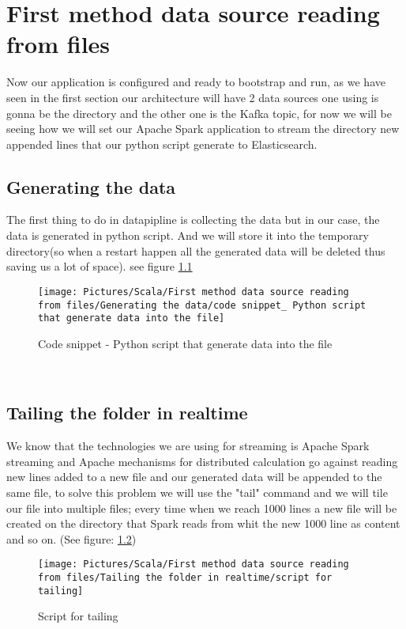 \chapter{First method data source reading from files}
\par 
Now our application is configured and ready to bootstrap and run, as we have seen in the first section our architecture will have 2 data sources one using is gonna be the directory and the other one is the Kafka topic, for now we will be seeing how we will set our Apache Spark application to stream the directory new appended lines that our python script generate to Elasticsearch.
\begin{spacing}{1.2}
\section{Generating the data }
\par 
The first thing to do in datapipline is collecting the data but in our case, the data is generated in python script. And we will store it into the temporary directory(so when a restart happen all the generated data will be deleted thus saving us a lot of space). see figure \ref{fig:python-file-gen}
\begin{figure}[!htb] 
\begin{center} 
\texttt{[image: Pictures/Scala/First method data source reading from files/Generating the data/code snippet\_ Python script that generate data into the file]} 
\end{center} 
\caption{Code snippet - Python script that generate data into the file} 
\label{fig:python-file-gen}
\end{figure}  \FloatBarrier
\\
\section{Tailing the folder in realtime }
\par We know that the technologies we are using for streaming is Apache Spark streaming and Apache mechanisms for distributed calculation go against reading new lines added to a new file and our generated data will be appended to the same file, to solve this problem we will use the "tail" command and we will tile our file into multiple files; every time when we reach 1000 lines a new file will be created on the directory that Spark reads from whit the new 1000 line as content and so on. (See figure: 
\ref{fig:file-tailor})
\\
\begin{figure}[!htb] 
\begin{center} 
\texttt{[image: Pictures/Scala/First method data source reading from files/Tailing the folder in realtime/script for tailing]} 
\end{center} 
\caption{Script for tailing} 
\label{fig:file-tailor}
\end{figure}  \FloatBarrier
\\

\end{spacing}
